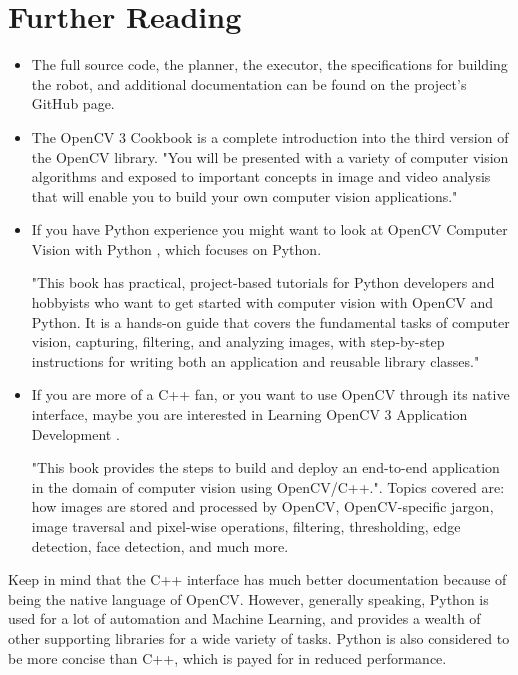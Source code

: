 \documentclass[12pt, a4paper]{article}
\begin{document}
\section{Further Reading}
\begin{itemize}
	\item The full source code, the planner, the executor, the specifications for building the robot, and additional documentation can be found on the project's GitHub page\cite{projectGithub}.
	\item The OpenCV 3 Cookbook \cite{openCVCookbook} is a complete introduction into the third version of the OpenCV library. "You will be presented with a variety of computer vision algorithms and exposed to important concepts in image and video analysis that will enable you to build your own computer vision applications." \cite{openCVCookbookWebsite}

	\item If you have Python experience you might want to look at OpenCV Computer Vision with Python \cite{openCVPython}, which focuses on Python.

	"This book has practical, project-based tutorials for Python developers and hobbyists who want to get started with computer vision with OpenCV and Python. It is a hands-on guide that covers the fundamental tasks of computer vision, capturing, filtering, and analyzing images, with step-by-step instructions for writing both an application and reusable library classes." \cite{openCVPythonWebsite}

	\item If you are more of a C++ fan, or you want to use OpenCV through its native interface, maybe you are interested in Learning OpenCV 3 Application Development \cite{openCVApplicationDevelopment}.

	"This book provides the steps to build and deploy an end-to-end application in the domain of computer vision using OpenCV/C++.". Topics covered are: how images are stored and processed by OpenCV, OpenCV-specific jargon, image traversal and pixel-wise operations, filtering, thresholding, edge detection, face detection, and much more. \cite{openCVApplicationDevelopmentWebsite}
\end{itemize}

Keep in mind that the C++ interface has much better documentation because of being the native language of OpenCV. However, generally speaking, Python is used for a lot of automation and Machine Learning, and provides a wealth of other supporting libraries for a wide variety of tasks. Python is also considered to be more concise than C++, which is payed for in reduced performance.
\end{document}
